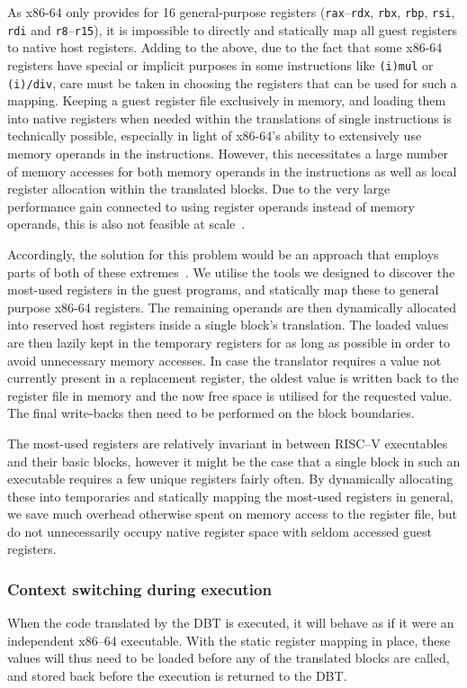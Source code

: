 As x86-64 only provides for 16 general-purpose registers (\texttt{rax}--\texttt{rdx}, \texttt{rbx}, \texttt{rbp}, \texttt{rsi}, \texttt{rdi} and \texttt{r8}--\texttt{r15}), it is impossible to directly and statically map all guest registers to native host registers.
Adding to the above, due to the fact that some x86-64 registers have special or implicit purposes in some instructions like \texttt{(i)mul} or \texttt{(i)/div}, care must be taken in choosing the registers that can be used for such a mapping.
Keeping a guest register file exclusively in memory, and loading them into native registers when needed within the translations of single instructions is technically possible, especially in light of x86-64's ability to extensively use memory operands in the instructions.
However, this necessitates a large number of memory accesses for both memory operands in the instructions as well as local register allocation within the translated blocks.
Due to the very large performance gain connected to using register operands instead of memory operands, this is also not feasible at scale~\cite[S. 8f.]{bintrans}.

Accordingly, the solution for this problem would be an approach that employs parts of both of these extremes~\cite[S. 9]{bintrans}.
We utilise the tools we designed to discover the most-used registers in the guest programs, and statically map these to general purpose x86-64 registers.
The remaining operands are then dynamically allocated into reserved host registers inside a single block's translation.
The loaded values are then lazily kept in the temporary registers for as long as possible in order to avoid unnecessary memory accesses.
In case the translator requires a value not currently present in a replacement register, the oldest value is written back to the register file in memory and the now free space is utilised for the requested value.
The final write-backs then need to be performed on the block boundaries.

The most-used registers are relatively invariant in between RISC--V executables and their basic blocks, however it might be the case that a single block in such an executable requires a few unique registers fairly often.
By dynamically allocating these into temporaries and statically mapping the most-used registers in general, we save much overhead otherwise spent on memory access to the register file, but do not unnecessarily occupy native register space with seldom accessed guest registers.

\subsubsection{Context switching during execution}
When the code translated by the DBT is executed, it will behave as if it were an independent x86--64 executable.
With the static register mapping in place, these values will thus need to be loaded before any of the translated blocks are called, and stored back before the execution is returned to the DBT\@.

